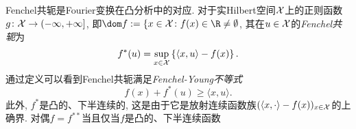 Fenchel共轭是Fourier变换在凸分析中的对应. 
对于实Hilbert空间$\mathcal{X}$上的正则函数$g \colon \mathcal{X} \to (-\infty, +\infty]$, 即$\dom f := \{x \in \cX \colon f(x) \in \R \neq \emptyset$, 其在$u \in \mathcal{X}$的\emph{Fenchel共轭}为
\begin{equation}
	f^*(u) = \sup_{x \in \mathcal{X}} \left\{ \langle x, u \rangle - f(x) \right\}. 
\end{equation}
通过定义可以看到Fenchel共轭满足\emph{Fenchel-Young不等式}
\begin{equation}
	f(x) + f^*(u) \geq \langle x, u \rangle. 
\end{equation}
此外, $f^*$是凸的、下半连续的, 这是由于它是放射连续函数族$(\langle x, \cdot \rangle - f(x))_{x \in \mathcal{X}}$的上确界. 
对偶$f = f^{**}$当且仅当$f$是凸的、下半连续函数













































